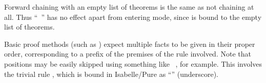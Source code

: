 \begin{isabellebody}
\begin{isamarkuptext}
\begin{description}
  \end{description}

  Forward chaining with an empty list of theorems is the same as not
  chaining at all.  Thus ``\hyperlink{command.from}{\mbox{}}~'' has no
  effect apart from entering  mode, since
  \hyperlink{fact.nothing}{\mbox{}} is bound to the empty list of theorems.

  Basic proof methods (such as \hyperlink{method.Pure.rule}{\mbox{}}) expect multiple
  facts to be given in their proper order, corresponding to a prefix
  of the premises of the rule involved.  Note that positions may be
  easily skipped using something like \hyperlink{command.from}{\mbox{}}~, for example.  This involves the trivial rule
  , which is bound in Isabelle/Pure as
  ``\hyperlink{fact.underscore}{\mbox{}}'' (underscore).


\end{isamarkuptext}
\end{isabellebody}
